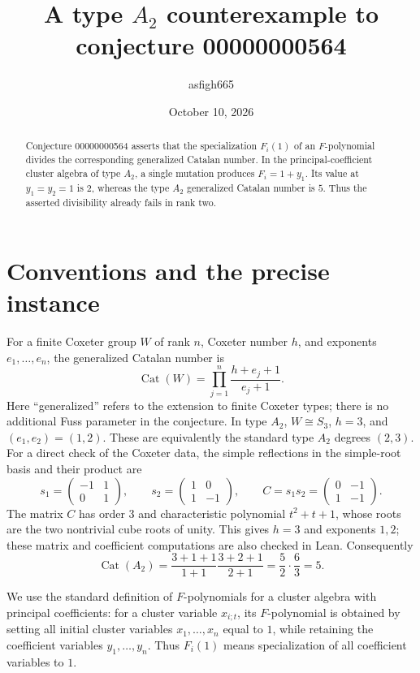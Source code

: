 \documentclass[11pt,a4paper]{article}
\title{A type $A_2$ counterexample to conjecture 00000000564}
\author{asfigh665}
\date{October 10, 2026}
\newcommand{\Cat}{\operatorname{Cat}}
\begin{document}
\maketitle
\begin{abstract}
Conjecture 00000000564 asserts that the specialization $F_i(1)$ of an
$F$-polynomial divides the corresponding generalized Catalan number.
In the principal-coefficient cluster algebra of type $A_2$, a single
mutation produces $F_i=1+y_1$. Its value at $y_1=y_2=1$ is $2$,
whereas the type $A_2$ generalized Catalan number is $5$.
Thus the asserted divisibility already fails in rank two.
\end{abstract}

\section{Conventions and the precise instance}
For a finite Coxeter group $W$ of rank $n$, Coxeter number $h$, and
exponents $e_1,\ldots,e_n$, the generalized Catalan number is
\[
  \Cat(W)=\prod_{j=1}^{n}\frac{h+e_j+1}{e_j+1}.
\]
Here ``generalized'' refers to the extension to finite Coxeter types;
there is no additional Fuss parameter in the conjecture.
In type $A_2$, $W\cong S_3$, $h=3$, and $(e_1,e_2)=(1,2)$.
These are equivalently the standard type $A_2$ degrees $(2,3)$.
For a direct check of the Coxeter data, the simple reflections in the
simple-root basis and their product are
\[
 s_1=\begin{pmatrix}-1&1\\0&1\end{pmatrix},\qquad
 s_2=\begin{pmatrix}1&0\\1&-1\end{pmatrix},\qquad
 C=s_1s_2=\begin{pmatrix}0&-1\\1&-1\end{pmatrix}.
\]
The matrix $C$ has order $3$ and characteristic polynomial $t^2+t+1$,
whose roots are the two nontrivial cube roots of unity. This gives
$h=3$ and exponents $1,2$; these matrix and coefficient computations
are also checked in Lean.
Consequently
\begin{equation}\label{eq:catalan}
  \Cat(A_2)=\frac{3+1+1}{1+1}\frac{3+2+1}{2+1}
           =\frac52\cdot\frac63=5.
\end{equation}

We use the standard definition of $F$-polynomials for a cluster algebra
with principal coefficients: for a cluster variable $x_{i;t}$, its
$F$-polynomial is obtained by setting all initial cluster variables
$x_1,\ldots,x_n$ equal to $1$, while retaining the coefficient variables
$y_1,\ldots,y_n$. Thus $F_i(1)$ means specialization of all coefficient
variables to $1$.
\end{document}
